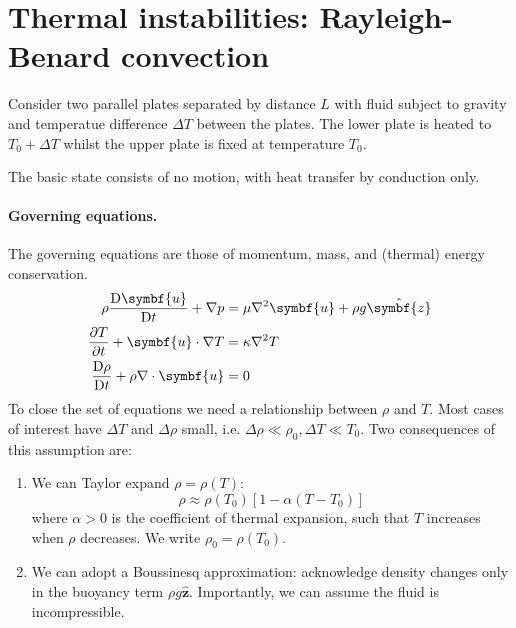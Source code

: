 \documentclass{jknotes}
\renewcommand{\u}{\symbf{u}}
\begin{document}
\section{Thermal instabilities: Rayleigh-Benard convection}
Consider two parallel plates separated by distance $L$ with fluid subject to
gravity and temperatue difference $\Delta T$ between the plates. The lower
plate is heated to $T_0 + \Delta T$ whilst the upper plate is fixed at
temperature $T_0$. 
\begin{center}
\end{center}

The basic state consists of no motion, with heat transfer by conduction only.
\paragraph{Governing equations.}
The governing equations are those of momentum, mass, and (thermal) energy
conservation.
\begin{align}
	\rho \frac{\diffD \u}{\diffD t} + \nabla p &= \mu \nabla^2 \u + \rho g
	\hat{\symbf{z}} \\
	\frac{\partial T}{\partial t} + \u \cdot \nabla T &= \kappa \nabla^2 T \\
	\frac{\diffD \rho}{\diffD t} + \rho \nabla \cdot \u &= 0
\end{align}
To close the set of equations we need a relationship between $\rho$ and $T$.
Most cases of interest have $\Delta T$ and $\Delta \rho$ small, i.e. $\Delta
\rho \ll \rho_0, \Delta T \ll T_0$. Two consequences of this assumption are:
\begin{enumerate}
	\item We can Taylor expand $\rho = \rho(T)$:
		\begin{equation}
			\rho \approx \rho(T_0) \left[ 1 - \alpha(T-T_0)\right]
		\end{equation}
		where $\alpha > 0$ is the coefficient of thermal expansion, such that
		$T$ increases when $\rho$ decreases. We write $\rho_0 = \rho(T_0)$.
	\item We can adopt a Boussinesq approximation: acknowledge density changes
		only in the buoyancy term $\rho g \hat{\symbf{z}}$. Importantly, we
		can assume the fluid is incompressible.
\end{enumerate}
\end{document}
